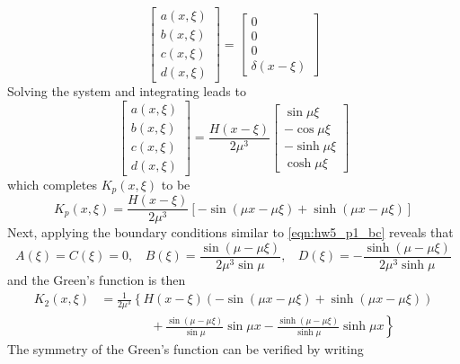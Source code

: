\begin{enumerate}[(i)]
{\begin{equation}
\begin{bmatrix}
            a(x, \xi) \\ b(x, \xi) \\ c(x, \xi) \\ d(x, \xi)
        \end{bmatrix} = \begin{bmatrix}
            0 \\ 0 \\ 0 \\ \delta(x - \xi)
        \end{bmatrix}
    \end{equation}
    Solving the system and integrating leads to 
    \begin{equation}
        \begin{bmatrix}
            a(x, \xi) \\ b(x, \xi) \\ c(x, \xi) \\ d(x, \xi)
        \end{bmatrix} = \frac{H(x - \xi)}{2\mu^3}\begin{bmatrix}
            \sin\mu\xi \\ -\cos\mu\xi \\ -\sinh\mu\xi \\ \cosh\mu\xi
        \end{bmatrix}
    \end{equation}
    which completes $K_p(x, \xi)$ to be
    \begin{equation}
        K_p(x, \xi) = \frac{H(x - \xi)}{2\mu^3}\left[-\sin(\mu x - \mu\xi) + \sinh(\mu x-\mu \xi)\right]
    \end{equation}
    Next, applying the boundary conditions similar to \cref{eqn:hw5_p1_bc} reveals that 
    \begin{equation}
        A(\xi) = C(\xi) = 0, ~~~~ B(\xi) = \frac{\sin(\mu-\mu\xi)}{2\mu^3\sin\mu}, ~~~~ D(\xi) = -\frac{\sinh(\mu-\mu\xi)}{2\mu^3\sinh\mu}
    \end{equation}
    and the Green's function is then 
    \begin{equation}
    \begin{aligned}
        K_2(x, \xi) &= \frac{1}{2\mu^3} \left\{H(x - \xi)\left(-\sin(\mu x - \mu\xi) + \sinh(\mu x-\mu \xi)\right) \right. \\
        &\qquad \qquad + \left.\frac{\sin(\mu-\mu\xi)}{\sin\mu}\sin\mu x - \frac{\sinh(\mu-\mu\xi)}{\sinh\mu}\sinh\mu x \right\}
    \end{aligned}
    \end{equation}
    The symmetry of the Green's function can be verified by writing
}
\end{enumerate}
